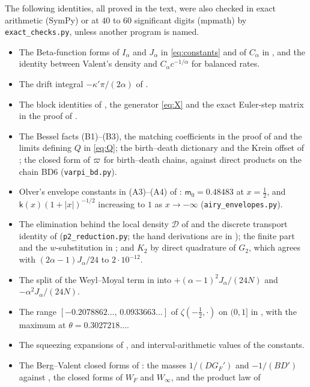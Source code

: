 The following identities, all proved in the text, were also checked in exact arithmetic (SymPy) or at
$40$ to $60$ significant digits (mpmath) by \texttt{exact\_checks.py}, unless another program is named.
\begin{itemize}
\item The Beta-function forms of $I_\alpha$ and $J_\alpha$ in \eqref{eq:constants} and of $C_\alpha$ in
  , and the identity between Valent's density and $C_\alpha c^{-1/\alpha}$ for balanced rates.
\item The drift integral $-\kappa'\pi/(2\alpha)$ of .
\item The block identities of , the generator \eqref{eq:X} and the exact Euler-step
  matrix in the proof of .
\item The Bessel facts (B1)--(B3), the matching coefficients in the proof of  and the limits
  defining $Q$ in \eqref{eq:Q}; the birth--death dictionary and the Krein offset of ; the
  closed form of $\varpi$ for birth--death chains, against direct products on the chain BD6
  (\texttt{varpi\_bd.py}).
\item Olver's envelope constants in (A3)--(A4) of : $\mathsf m_0=0.48483$ at $x=\frac12$, and
  $\mathsf k(x)(1+|x|)^{-1/2}$ increasing to $1$ as $x\to-\infty$ (\texttt{airy\_envelopes.py}).
\item The elimination behind the local density $\mathcal D$ of  and the discrete transport
  identity of  (\texttt{p2\_reduction.py}; the hand derivations are in
  ); the finite part and the $w$-substitution in ; and $K_2$ by direct
  quadrature of $G_2$, which agrees with $(2\alpha-1)J_\alpha/24$ to $2\cdot10^{-12}$.
\item The split of the Weyl--Moyal term in  into $+(\alpha-1)^2J_\alpha/(24N)$ and
  $-\alpha^2J_\alpha/(24N)$.
\item The range $[-0.2078862\ldots,\,0.0933663\ldots]$ of $\zeta(-\frac12,\cdot)$ on $(0,1]$ in
  , with the maximum at $\theta=0.3027218\ldots$.
\item The squeezing expansions of , and interval-arithmetic values of the constants.
\item The Berg--Valent closed forms of : the masses $1/(DG_F')$ and $-1/(BD')$ against
  \cite[(29)--(30)]{BergSzwarc2026}, the closed forms of $W_F$ and $W_\infty$, and the product law of

\end{itemize}
